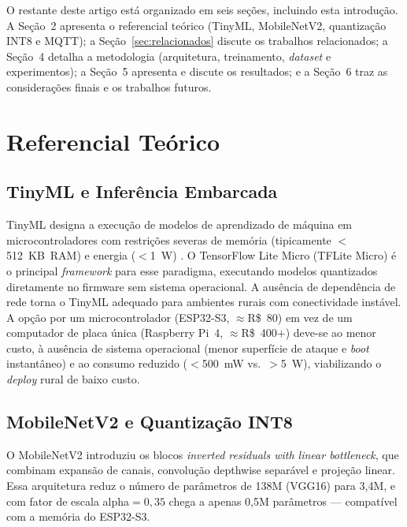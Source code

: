 \documentclass[12pt]{article}
\begin{document}
O restante deste artigo está organizado em seis seções, incluindo esta introdução.
A Seção~2 apresenta o referencial teórico (TinyML, MobileNetV2, quantização INT8 e
MQTT); a Seção~\ref{sec:relacionados} discute os trabalhos relacionados; a Seção~4
detalha a metodologia (arquitetura, treinamento, \textit{dataset} e experimentos);
a Seção~5 apresenta
e discute os resultados; e a Seção~6 traz as considerações finais e os trabalhos
futuros.


\section{Referencial Teórico}

\subsection{TinyML e Inferência Embarcada}

TinyML designa a execução de modelos de aprendizado de máquina em
microcontroladores com restrições severas de memória (tipicamente $<$512~KB~RAM)
e energia ($<$1~W) \cite{warden2019}. O TensorFlow Lite Micro (TFLite Micro) é o
principal \textit{framework} para esse paradigma, executando modelos quantizados
diretamente no firmware sem sistema operacional. A ausência de dependência de rede
torna o TinyML adequado para ambientes rurais com conectividade instável.
A opção por um microcontrolador (ESP32-S3, $\approx$R\$~80) em vez de um computador
de placa única (Raspberry Pi~4, $\approx$R\$~400$+$) deve-se ao menor custo, à
ausência de sistema operacional (menor superfície de ataque e \textit{boot}
instantâneo) e ao consumo reduzido ($<$500~mW vs.\ $>$5~W), viabilizando o
\textit{deploy} rural de baixo custo.

\subsection{MobileNetV2 e Quantização INT8}

O MobileNetV2 \cite{howard2017,sandler2018} introduziu os blocos
\textit{inverted residuals with linear bottleneck}, que combinam expansão de
canais, convolução depthwise separável e projeção linear. Essa arquitetura reduz
o número de parâmetros de 138M (VGG16) para 3,4M, e com fator de escala
alpha$=0{,}35$ chega a apenas 0,5M parâmetros --- compatível com a memória do
ESP32-S3.
\end{document}
